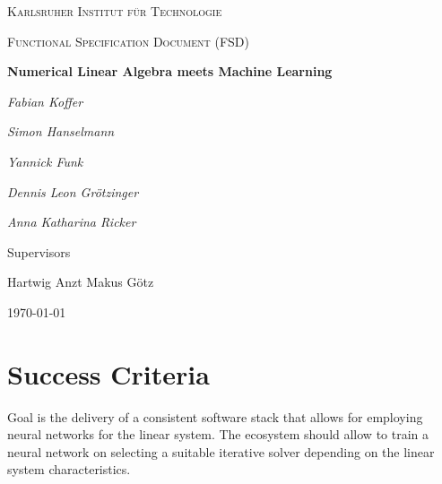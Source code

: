 \documentclass[parskip=full]{scrartcl}
\begin{document}
\begin{titlepage}
\centering
{\scshape\LARGE Karlsruher Institut für Technologie\par}
\vspace{1cm}
{\scshape\Large Functional Specification Document (FSD)\par}
\vspace{1.5cm}
{\huge\bfseries Numerical Linear Algebra meets Machine Learning \par}
\vspace {2cm}

{\Large\itshape Fabian Koffer\par}
{\Large\itshape Simon Hanselmann\par}
{\Large\itshape Yannick Funk\par}
{\Large\itshape Dennis Leon Gr\"{o}tzinger\par}
{\Large\itshape Anna Katharina Ricker\par}

\vfill
Supervisors\par
Hartwig Anzt
Makus G\"{o}tz

\vfill
{\large\today\par}
\end{titlepage}

\tableofcontents
\newpage


\section{Success Criteria}

Goal is the delivery of a consistent software stack that allows for employing 
\glspl{neural network} for the linear system. 
The ecosystem should allow to train a \gls{neural network} on selecting a suitable \gls{iterative solver} depending on the linear system characteristics.
\end{document}
